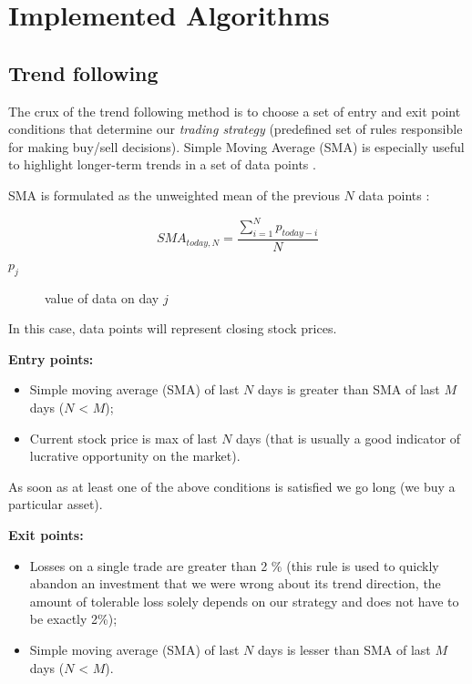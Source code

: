 \chapter{Implemented Algorithms}
\label{cha:implementedAlgorithms}



\section{Trend following}
\label{trend_following_impl}

The crux of the trend following method is to choose a set of entry and exit point conditions that determine our \emph{trading strategy} (predefined set of rules 
responsible for making buy/sell decisions).
Simple Moving Average (SMA) is especially useful to highlight longer-term trends in a set of data points \cite{Trend01}.

SMA is formulated as the unweighted mean of the previous $N$ data points \cite{Trend01}:

\begin{equation}
    SMA_{today,N} = \frac{\sum_{i=1}^{N}p_{today - i}}{N}
\end{equation}

\begin{description}
  \item [$p_{j}$] 
    value of data on day $j$
\end{description}

In this case, data points will represent closing stock prices. 
 


\textbf{Entry points:}
  \begin{itemize}
    \item Simple moving average (SMA) of last $N$ days is greater than SMA of last $M$ days ($N$ < $M$);
    \item Current stock price is max of last $N$ days (that is usually a good indicator of lucrative opportunity on the market).
  \end{itemize}

As soon as at least one of the above conditions is satisfied we go long (we buy a particular asset).


\textbf{Exit points:}
  \begin{itemize}
    \item Losses on a single trade are greater than 2 \% (this rule is used to quickly abandon an investment that we were wrong about its trend direction,
	  the amount of tolerable loss solely depends on our strategy and does not have to be exactly 2\%);
    \item Simple moving average (SMA) of last $N$ days is lesser than SMA of last $M$ days ($N$ < $M$).
  \end{itemize}

